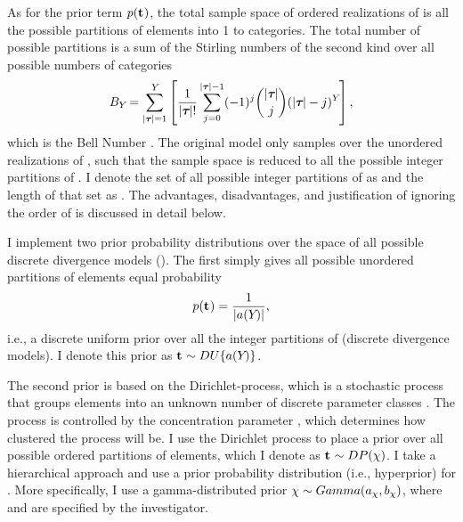 \begin{linenomath}
As for the prior term $p(\mathbf{t_{}})$, the total sample space of
ordered realizations of \divTimeIndexVector is all the possible partitions of
\npairs{} elements into 1 to \npairs{} categories.
The total number of possible partitions is a sum of the Stirling numbers of
the second kind over all possible numbers of categories \divTimeNum
\begin{equation}
    B_{Y_{}}=\sum_{\lvert \boldsymbol{\tau_{}} \rvert=1}^{Y_{}} \left[
    \frac{1}{\lvert \boldsymbol{\tau_{}} \rvert!} \sum_{j=0}^{\lvert \boldsymbol{\tau_{}} \rvert-1} (-1)^{j}
    \binom{\lvert \boldsymbol{\tau_{}} \rvert}{j} (\lvert \boldsymbol{\tau_{}} \rvert-j)^{Y_{}} \right],
    \label{eq:bell}
\end{equation}
which is the Bell Number \citep{Bell1934}.
The original \msb model only samples over the unordered realizations of
\divTimeIndexVector, such that the sample space is reduced to all the possible
integer partitions of \npairs{} \citep{Oaks2012,Huang2011,OeisPartitionNumber,
    OeisPartitionTriangle,Malenfant2011}.
I denote the set of all possible integer partitions of \npairs{} as
\integerPartitionSet{\npairs{}} and the length of that set as
\integerPartitionNum{\npairs{}}.
The advantages, disadvantages, and justification of ignoring the order
of \divTimeIndexVector is discussed in detail below.
\end{linenomath}

\begin{linenomath}
I implement two prior probability distributions over the space
of all possible discrete divergence models (\divTimeIndexVector).
The first simply gives all possible unordered partitions of \npairs{} elements
equal probability
\begin{equation}
    p(\mathbf{t_{}}) = \frac{1}{\lvert a({Y_{}}) \rvert},
    \label{eq:divModelPriorUniform}
\end{equation}
i.e., a discrete uniform prior over all the integer partitions of \npairs{}
(discrete divergence models).
I denote this prior as
$\mathbf{t_{}} \sim DU\{a({Y_{}})\}$.
\end{linenomath}

The second prior is based on the Dirichlet-process, which is a
stochastic process that groups elements into an unknown number of discrete
parameter classes \citep{Ferguson1973,Antoniak1974}.
The process is controlled by the concentration parameter \concentrationParam,
which determines how clustered the process will be.
I use the Dirichlet process to place a prior over all possible ordered
partitions of \npairs{} elements, which I denote as $\mathbf{t_{}} \sim
DP(\chi )$.
I take a hierarchical approach and use a prior probability
distribution (i.e., hyperprior) for \concentrationParam.
More specifically, I use a gamma-distributed prior $\chi \sim
Gamma(a_{\chi}, b_{\chi})$,
where \gammaShape{\concentrationParam} and \gammaScale{\concentrationParam} are
specified by the investigator.

